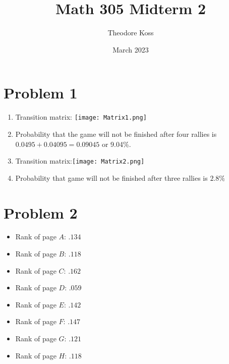 \documentclass{article}
\title{Math 305 Midterm 2}
\author{Theodore Koss}
\date{March 2023}
\begin{document}
\maketitle

\section*{Problem 1}
\begin{enumerate}[label=(\alph*)]
    \item Transition matrix: \newline\texttt{[image: Matrix1.png]}
    \item Probability that the game will not be finished after four rallies is $0.0495+ 0.04095 = 0.09045$ or 9.04\%.
    \item Transition matrix:\newline\texttt{[image: Matrix2.png]}
    \item Probability that game will not be finished after three rallies is $2.8\%$
\end{enumerate}
\section*{Problem 2}
\begin{itemize}
    \item Rank of page $A$: $.134$
    \item Rank of page $B$: $.118$
    \item Rank of page $C$: $.162$
    \item Rank of page $D$: $.059$
    \item Rank of page $E$: $.142$
    \item Rank of page $F$: $.147$
    \item Rank of page $G$: $.121$
    \item Rank of page $H$: $.118$
\end{itemize}
\end{document}
